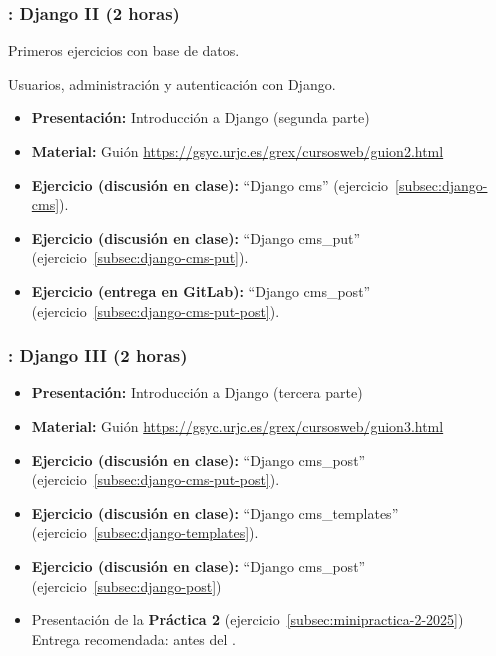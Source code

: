 \documentclass[a4paper,12pt]{article}
\begin{document}
\subsubsection{\juevesH: Django II (2 horas)}
\label{cal:juevesH}

Primeros ejercicios con base de datos.

Usuarios, administración y autenticación con Django.

\begin{itemize}
 \item \textbf{Presentación:} Introducción a Django (segunda parte)
  \item \textbf{Material:} Guión \url{https://gsyc.urjc.es/grex/cursosweb/guion2.html}
 \item \textbf{Ejercicio  (discusión en clase):} ``Django cms'' (ejercicio~\ref{subsec:django-cms}). \\
 \item \textbf{Ejercicio (discusión en clase):} ``Django cms\_put'' (ejercicio~\ref{subsec:django-cms-put}). \\
 \item \textbf{Ejercicio (entrega en GitLab):} ``Django cms\_post'' (ejercicio~\ref{subsec:django-cms-put-post}). \\
\end{itemize}


\subsubsection{\juevesI: Django III (2 horas)}
\label{cal:juevesI}

\begin{itemize}
 \item \textbf{Presentación:} Introducción a Django (tercera parte)
  \item \textbf{Material:} Guión \url{https://gsyc.urjc.es/grex/cursosweb/guion3.html}
  \item \textbf{Ejercicio (discusión en clase):} ``Django cms\_post'' (ejercicio~\ref{subsec:django-cms-put-post}). \\
 \item \textbf{Ejercicio (discusión en clase):} ``Django cms\_templates'' (ejercicio~\ref{subsec:django-templates}).
 \item \textbf{Ejercicio (discusión en clase):} ``Django cms\_post'' (ejercicio~\ref{subsec:django-post}) \\
  \item Presentación de la \textbf{Práctica 2} (ejercicio~\ref{subsec:minipractica-2-2025}) \\
  Entrega recomendada: antes del \juevesK.
\end{itemize}
\end{document}
